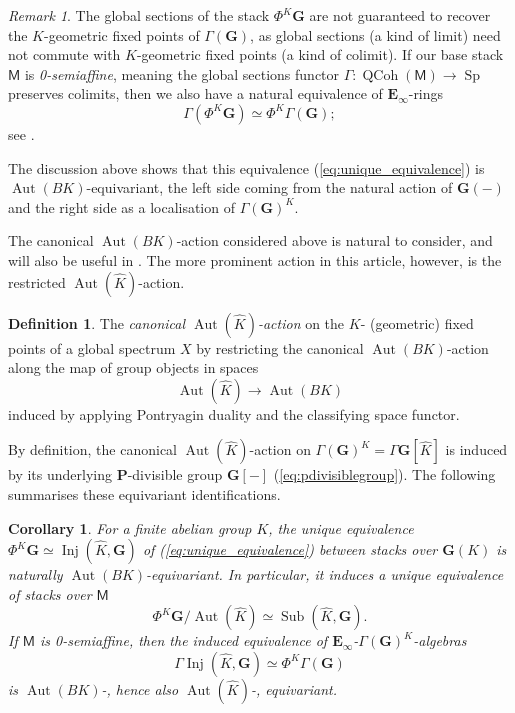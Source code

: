 \documentclass[11pt, a4paper]{article}
\newcommand{\1}{\mathbf{1}}
\DeclareMathOperator{\Inj}{Inj}
\DeclareMathOperator{\Sub}{Sub}
\DeclareMathOperator{\QCoh}{QCoh}
\DeclareMathOperator{\Sp}{Sp}
\DeclareMathOperator{\Aut}{Aut}
\newcommand{\dual}[1]{{\widehat{#1}}}
\newcommand{\E}{\mathbf{E}}
\newcommand{\G}{\mathbf{G}}
\newcommand{\M}{\mathsf{M}}
\renewcommand{\P}{\mathbf{P}}
\newcommand{\Ga}{\Gamma}
\theoremstyle{plain}
\newtheorem{cor}[equation]{Corollary}
\theoremstyle{definition}
\newtheorem{mydef}[equation]{Definition}
\theoremstyle{remark}\numberwithin{equation}{section}
\newtheorem{remark}[equation]{Remark}
\begin{document}
\begin{remark}
The global sections of the stack $\Phi^K \G$ are not guaranteed to recover the $K$-geometric fixed points of $\Ga(\G)$, as global sections (a kind of limit) need not commute with $K$-geometric fixed points (a kind of colimit). If our base stack $\M$ is \emph{0-semiaffine}, meaning the global sections functor $\Ga \colon \QCoh(\M) \to \Sp$ preserves colimits, then we also have a natural equivalence of $\E_\infty$-rings
\[\Ga(\Phi^K \G) \simeq \Phi^K \Ga(\G);\]
see \cite[Rmk.5.3.8]{temperedglobal}.
\end{remark}

The discussion above shows that this equivalence (\ref{eq:unique_equivalence}) is $\Aut(B{K})$-equivariant, the left side coming from the natural action of $\G(-)$ and the right side as a localisation of $\Ga(\G)^K$.

The canonical $\Aut(BK)$-action considered above is natural to consider, and will also be useful in . The more prominent action in this article, however, is the restricted $\Aut(\dual{K})$-action.

\begin{mydef}
    The \emph{canonical $\Aut(\dual{K})$-action} on the $K$- (geometric) fixed points of a global spectrum $X$ by restricting the canonical $\Aut(BK)$-action along the map of group objects in spaces
    \[\Aut(\dual{K}) \to \Aut(BK)\]
    induced by applying Pontryagin duality and the classifying space functor.
\end{mydef}

By definition, the canonical $\Aut(\dual{K})$-action on $\Ga(\G)^K = \Ga \G[\dual{K}]$ is induced by its underlying $\P$-divisible group $\G[-]$ (\ref{eq:pdivisiblegroup}). The following summarises these equivariant identifications.

\begin{cor}\label{cor:identification_with_inj}
    For a finite abelian group $K$, the unique equivalence $\Phi^K \G \simeq \Inj(\dual{K},\G)$ of (\ref{eq:unique_equivalence}) between stacks over $\G(K)$ is naturally $\Aut(B{K})$-equivariant. In particular, it induces a unique equivalence of stacks over $\M$
    \[\Phi^K \G / \Aut(\dual{K}) \simeq \Sub(\dual{K}, \G).\]
    If $\M$ is 0-semiaffine, then the induced equivalence of $\E_\infty$-$\Ga(\G)^K$-algebras
    \[\Ga\Inj(\dual{K}, \G) \simeq\Phi^K \Ga(\G)\]
    is $\Aut(B{K})$-, hence also $\Aut(\dual{K})$-, equivariant.
\end{cor}
\end{document}
